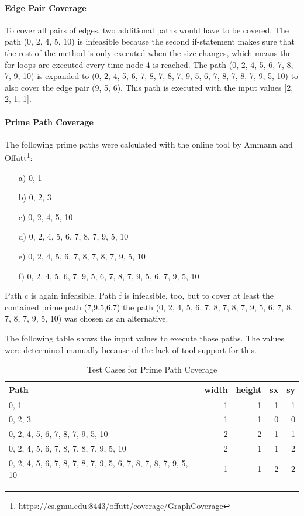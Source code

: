 \documentclass{scrreprt}
\begin{document}
\paragraph{Edge Pair Coverage} To cover all pairs of edges, two additional paths would have to be covered. The path (0, 2, 4, 5, 10) is infeasible because the second if-statement makes sure that the rest of the method is only executed when the size changes, which means the for-loops are executed every time node 4 is reached.
The path (0, 2, 4, 5, 6, 7, 8, 7, 9, 10) is expanded to (0, 2, 4, 5, 6, 7, 8, 7, 8, 7, 9, 5, 6, 7, 8, 7, 8, 7, 9, 5, 10) to also cover the edge pair (9, 5, 6). This path is executed with the input values [2, 2, 1, 1].

\paragraph{Prime Path Coverage} The following prime paths were calculated with the online tool by Ammann and Offutt\footnote{\url{https://cs.gmu.edu:8443/offutt/coverage/GraphCoverage}}:

\begin{itemize}
	\item[a)] 0, 1
	\item[b)] 0, 2, 3
	\item[c)] 0, 2, 4, 5, 10
	\item[d)] 0, 2, 4, 5, 6, 7, 8, 7, 9, 5, 10
	\item[e)] 0, 2, 4, 5, 6, 7, 8, 7, 8, 7, 9, 5, 10
	\item[f)] 0, 2, 4, 5, 6, 7, 9, 5, 6, 7, 8, 7, 9, 5, 6, 7, 9, 5, 10
\end{itemize}

Path c is again infeasible. Path f is infeasible, too, but to cover at least the contained prime path (7,9,5,6,7) the path (0, 2, 4, 5, 6, 7, 8, 7, 8, 7, 9, 5, 6, 7, 8, 7, 8, 7, 9, 5, 10) was chosen as an alternative.

The following table shows the input values to execute those paths. The values were determined manually because of the lack of tool support for this.

\begin{table}[h]
	\centering
	\caption{Test Cases for Prime Path Coverage}
	\begin{tabular}{l|r|r|r|r}
		Path           & width & height & sx & sy  \\ \hline
		0, 1           &     1 &      1 &  1 &  1  \\
		0, 2, 3        &     1 &      1 &  0 &  0  \\
		0, 2, 4, 5, 6, 7, 8, 7, 9, 5, 10        &     2 &      2 &  1 &  1  \\
		0, 2, 4, 5, 6, 7, 8, 7, 8, 7, 9, 5, 10  &     2 &      1 &  1 &  2  \\
		0, 2, 4, 5, 6, 7, 8, 7, 8, 7, 9, 5, 6, 7, 8, 7, 8, 7, 9, 5, 10 &     1 &      1 &  2 &  2  \\
	\end{tabular}
\end{table}
\end{document}
